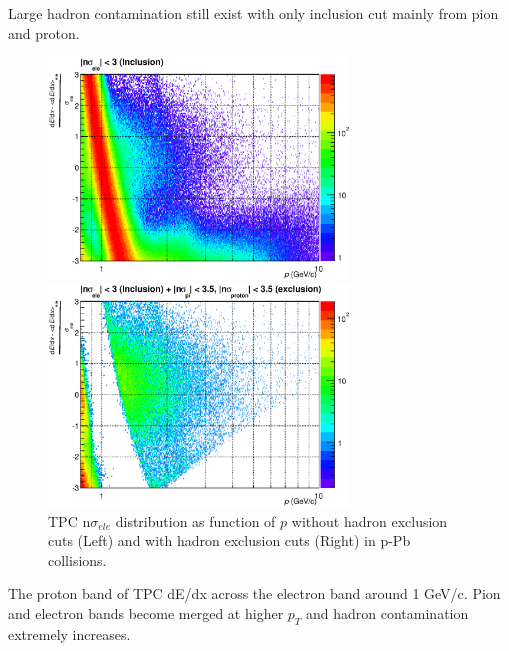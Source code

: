 Large hadron contamination still exist with only inclusion cut mainly from pion and proton. 
\begin{figure}[htbp]
 \begin{minipage}{0.5\hsize}
  \begin{center}
  \includegraphics[width=8cm]{chap4/figure/PID/TPCNSigma_AfterInclusion_MB.eps}
  \end{center}
 \end{minipage}
 \begin{minipage}{0.5\hsize}
  \begin{center}
  \includegraphics[width=8cm]{chap4/figure/PID/TPCNSigma_AfterExclusion_MB.eps}
  \end{center}
 \end{minipage}
  \caption{TPC n$\sigma_{ele}$ distribution as function of $p$ without hadron exclusion cuts (Left) and with hadron exclusion cuts (Right) in p-Pb collisions.}
  \label{fig_4_tpcnsigmacut}
\end{figure}
The proton band of TPC dE/dx across the electron band around 1 GeV/c.  
Pion and electron bands become merged at higher $p_{T}$ and hadron contamination extremely increases.   

%

